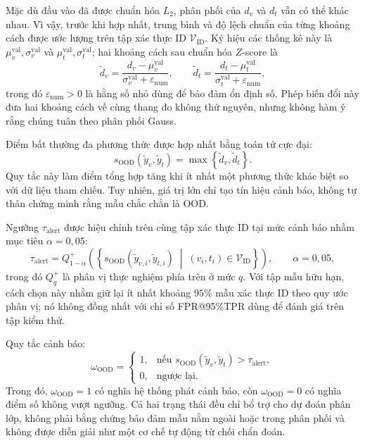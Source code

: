 Mặc dù đầu vào đã được chuẩn hóa $L_2$, phân phối của $d_v$ và $d_t$ vẫn có thể khác nhau. Vì vậy, trước khi hợp nhất, trung bình và độ lệch chuẩn của từng khoảng cách được ước lượng trên tập xác thực ID $\mathcal{V}_{\mathrm{ID}}$. Ký hiệu các thống kê này là $\mu_v^{\mathrm{val}},\sigma_v^{\mathrm{val}}$ và $\mu_t^{\mathrm{val}},\sigma_t^{\mathrm{val}}$; hai khoảng cách sau chuẩn hóa $Z$-score là
\begin{equation}
\widetilde{d}_v
=
\frac{d_v-\mu_v^{\mathrm{val}}}
{\sigma_v^{\mathrm{val}}+\varepsilon_{\mathrm{num}}},
\qquad
\widetilde{d}_t
=
\frac{d_t-\mu_t^{\mathrm{val}}}
{\sigma_t^{\mathrm{val}}+\varepsilon_{\mathrm{num}}},
\label{eq:ch3_ood_zscore}
\end{equation}
trong đó $\varepsilon_{\mathrm{num}}>0$ là hằng số nhỏ dùng để bảo đảm ổn định số. Phép biến đổi này đưa hai khoảng cách về cùng thang đo không thứ nguyên, nhưng không hàm ý rằng chúng tuân theo phân phối Gauss.

Điểm bất thường đa phương thức được hợp nhất bằng toán tử cực đại:
\begin{equation}
s_{\mathrm{OOD}}\!\left(\widetilde{y}_v,\widetilde{y}_t\right)
=
\max\left\{\widetilde{d}_v,\widetilde{d}_t\right\}.
\label{eq:ch3_ood_max_fusion}
\end{equation}
Quy tắc này làm điểm tổng hợp tăng khi ít nhất một phương thức khác biệt so với dữ liệu tham chiếu. Tuy nhiên, giá trị lớn chỉ tạo tín hiệu cảnh báo, không tự thân chứng minh rằng mẫu chắc chắn là OOD.

Ngưỡng $\tau_{\mathrm{alert}}$ được hiệu chỉnh trên cùng tập xác thực ID tại mức cảnh báo nhầm mục tiêu $\alpha=0{,}05$:
\begin{equation}
\tau_{\mathrm{alert}}
=
Q_{1-\alpha}^{+}
\!\left(
\left\{
s_{\mathrm{OOD}}\!\left(\widetilde{y}_{v,i},\widetilde{y}_{t,i}\right)
\;\middle|\;
(v_i,t_i)\in\mathcal{V}_{\mathrm{ID}}
\right\}
\right),
\qquad \alpha=0{,}05,
\label{eq:ch3_ood_threshold}
\end{equation}
trong đó $Q_q^{+}$ là phân vị thực nghiệm phía trên ở mức $q$. Với tập mẫu hữu hạn, cách chọn này nhằm giữ lại ít nhất khoảng $95\%$ mẫu xác thực ID theo quy ước phân vị; nó không đồng nhất với chỉ số FPR@95\%TPR dùng để đánh giá trên tập kiểm thử.

\pagebreak

Quy tắc cảnh báo:
\begin{equation}
\omega_{\mathrm{OOD}}
=
\begin{cases}
1,
& \text{nếu }s_{\mathrm{OOD}}\!\left(\widetilde{y}_v,\widetilde{y}_t\right)
>\tau_{\mathrm{alert}},\\[3pt]
0,
& \text{ngược lại}.
\end{cases}
\label{eq:ch3_ood_decision}
\end{equation}
Trong đó, $\omega_{\mathrm{OOD}}=1$ có nghĩa hệ thống phát cảnh báo, còn $\omega_{\mathrm{OOD}}=0$ có nghĩa điểm số không vượt ngưỡng. Cả hai trạng thái đều chỉ bổ trợ cho dự đoán phân lớp, không phải bằng chứng bảo đảm mẫu nằm ngoài hoặc trong phân phối và không được diễn giải như một cơ chế tự động từ chối chẩn đoán.

